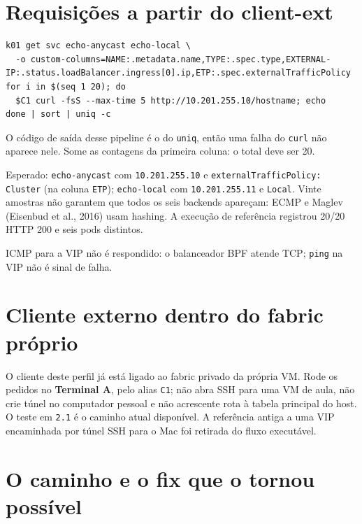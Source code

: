 \documentclass[12pt,openany,oneside,a4paper,chapter=TITLE,english,brazil]{abntex2}
\begin{document}
\section{Requisições a partir do client-ext}\label{requisiuxe7uxf5es-a-partir-do-client-ext}

\begin{verbatim}
k01 get svc echo-anycast echo-local \
  -o custom-columns=NAME:.metadata.name,TYPE:.spec.type,EXTERNAL-IP:.status.loadBalancer.ingress[0].ip,ETP:.spec.externalTrafficPolicy
for i in $(seq 1 20); do
  $C1 curl -fsS --max-time 5 http://10.201.255.10/hostname; echo
done | sort | uniq -c
\end{verbatim}

O código de saída desse pipeline é o do \texttt{uniq}, então uma falha do \texttt{curl} não
aparece nele. Some as contagens da primeira coluna: o total deve ser 20.

Esperado: \texttt{echo-{}\allowbreak{}anycast} com \texttt{10.\allowbreak{}201.\allowbreak{}255.\allowbreak{}10} e \texttt{external\allowbreak{}Traffic\allowbreak{}Policy:\allowbreak{} Cluster} (na coluna \texttt{ETP}); \texttt{echo-{}\allowbreak{}local} com \texttt{10.\allowbreak{}201.\allowbreak{}255.\allowbreak{}11} e \texttt{Local}. Vinte amostras não
garantem que todos os seis backends apareçam: ECMP e Maglev (Eisenbud et al., 2016) usam hashing. A
execução de referência registrou 20/20 HTTP 200 e seis pods distintos.

ICMP para a VIP não é respondido: o balanceador BPF atende TCP; \texttt{ping} na VIP
não é sinal de falha.

\section{Cliente externo dentro do fabric próprio}\label{cliente-externo-dentro-do-fabric-pruxf3prio}

O cliente deste perfil já está ligado ao fabric privado da própria VM. Rode os
pedidos no \textbf{Terminal A}, pelo alias \texttt{C1}; não abra SSH para uma VM de aula,
não crie túnel no computador pessoal e não acrescente rota à tabela principal
do host. O teste em \texttt{2.\allowbreak{}1} é o caminho atual disponível. A referência antiga a
uma VIP encaminhada por túnel SSH para o Mac foi retirada do fluxo executável.

\section{O caminho e o fix que o tornou possível}\label{o-caminho-e-o-fix-que-o-tornou-possuxedvel}
\end{document}
